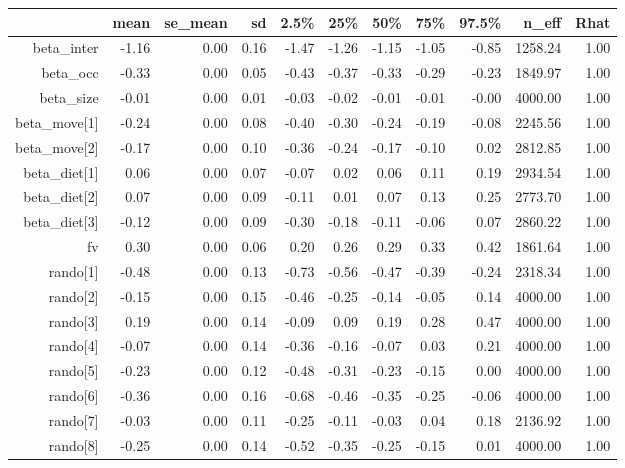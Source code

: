 \begin{table}[ht]
\centering
\begin{tabular}{rrrrrrrrrrr}
  \hline
 & mean & se\_mean & sd & 2.5\% & 25\% & 50\% & 75\% & 97.5\% & n\_eff & Rhat \\ 
  \hline
beta\_inter & -1.16 & 0.00 & 0.16 & -1.47 & -1.26 & -1.15 & -1.05 & -0.85 & 1258.24 & 1.00 \\ 
  beta\_occ & -0.33 & 0.00 & 0.05 & -0.43 & -0.37 & -0.33 & -0.29 & -0.23 & 1849.97 & 1.00 \\ 
  beta\_size & -0.01 & 0.00 & 0.01 & -0.03 & -0.02 & -0.01 & -0.01 & -0.00 & 4000.00 & 1.00 \\ 
  beta\_move[1] & -0.24 & 0.00 & 0.08 & -0.40 & -0.30 & -0.24 & -0.19 & -0.08 & 2245.56 & 1.00 \\ 
  beta\_move[2] & -0.17 & 0.00 & 0.10 & -0.36 & -0.24 & -0.17 & -0.10 & 0.02 & 2812.85 & 1.00 \\ 
  beta\_diet[1] & 0.06 & 0.00 & 0.07 & -0.07 & 0.02 & 0.06 & 0.11 & 0.19 & 2934.54 & 1.00 \\ 
  beta\_diet[2] & 0.07 & 0.00 & 0.09 & -0.11 & 0.01 & 0.07 & 0.13 & 0.25 & 2773.70 & 1.00 \\ 
  beta\_diet[3] & -0.12 & 0.00 & 0.09 & -0.30 & -0.18 & -0.11 & -0.06 & 0.07 & 2860.22 & 1.00 \\ 
  fv & 0.30 & 0.00 & 0.06 & 0.20 & 0.26 & 0.29 & 0.33 & 0.42 & 1861.64 & 1.00 \\ 
  rando[1] & -0.48 & 0.00 & 0.13 & -0.73 & -0.56 & -0.47 & -0.39 & -0.24 & 2318.34 & 1.00 \\ 
  rando[2] & -0.15 & 0.00 & 0.15 & -0.46 & -0.25 & -0.14 & -0.05 & 0.14 & 4000.00 & 1.00 \\ 
  rando[3] & 0.19 & 0.00 & 0.14 & -0.09 & 0.09 & 0.19 & 0.28 & 0.47 & 4000.00 & 1.00 \\ 
  rando[4] & -0.07 & 0.00 & 0.14 & -0.36 & -0.16 & -0.07 & 0.03 & 0.21 & 4000.00 & 1.00 \\ 
  rando[5] & -0.23 & 0.00 & 0.12 & -0.48 & -0.31 & -0.23 & -0.15 & 0.00 & 4000.00 & 1.00 \\ 
  rando[6] & -0.36 & 0.00 & 0.16 & -0.68 & -0.46 & -0.35 & -0.25 & -0.06 & 4000.00 & 1.00 \\ 
  rando[7] & -0.03 & 0.00 & 0.11 & -0.25 & -0.11 & -0.03 & 0.04 & 0.18 & 2136.92 & 1.00 \\ 
  rando[8] & -0.25 & 0.00 & 0.14 & -0.52 & -0.35 & -0.25 & -0.15 & 0.01 & 4000.00 & 1.00 \\ 

\end{tabular}
\end{table}
